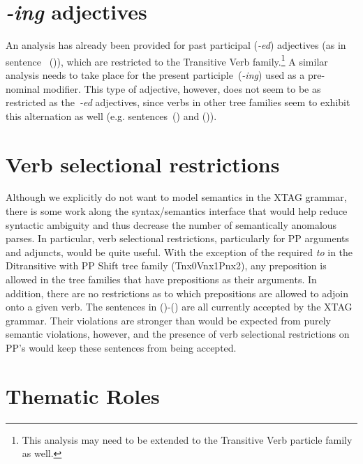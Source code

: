 \section{{\it -ing} adjectives}

An analysis has already been provided for past participal ({\it -ed})
adjectives (as in sentence~ ()), which are restricted to the
Transitive Verb family.\footnote{This analysis may need to be extended
to the Transitive Verb particle family as well.}  A similar analysis
needs to take place for the present participle~({\it -ing}) used as a
pre-nominal modifier.  This type of adjective, however, does not seem
to be as restricted as the~{\it -ed} adjectives, since verbs in other
tree families seem to exhibit this alternation as well
(e.g. sentences~() and ()).



\section{Verb selectional restrictions}

Although we explicitly do not want to model semantics in the XTAG grammar,
there is some work along the syntax/semantics interface that would help reduce
syntactic ambiguity and thus decrease the number of semantically anomalous
parses.  In particular, verb selectional restrictions, particularly for PP
arguments and adjuncts, would be quite useful.  With the exception of the
required {\it to} in the Ditransitive with PP Shift tree family (Tnx0Vnx1Pnx2),
any preposition is allowed in the tree families that have prepositions as their
arguments.  In addition, there are no restrictions as to which prepositions are
allowed to adjoin onto a given verb.  The sentences in ()-() are
all currently accepted by the XTAG grammar.  Their violations are stronger than
would be expected from purely semantic violations, however, and the presence of
verb selectional restrictions on PP's would keep these sentences from being
accepted.


\section{Thematic Roles}

